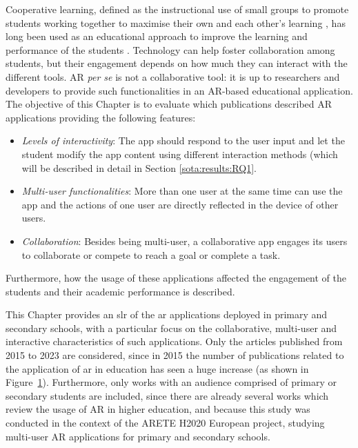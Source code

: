 Cooperative learning, defined as the instructional use of small groups to promote students working together to maximise their own and each other's learning \citep{johnson1991cooperation}, has long been used as an educational approach to improve the learning and performance of the students \citep{johnson2008active, kuh2011piecing}. Technology can help foster collaboration among students, but their engagement depends on how much they can interact with the different tools. AR \textit{per se} is not a collaborative tool: it is up to researchers and developers to provide such functionalities in an AR-based educational application. The objective of this Chapter is to evaluate which publications described AR applications providing the following features:
\begin{itemize}
    \item \emph{Levels of interactivity}: The app should respond to the user input and let the student modify the app content using different interaction methods (which will be described in detail in Section \ref{sota:results:RQ1}.
    \item \emph{Multi-user functionalities}: More than one user at the same time can use the app and the actions of one user are directly reflected in the device of other users.
    \item \emph{Collaboration}: Besides being multi-user, a collaborative app engages its users to collaborate or compete to reach a goal or complete a task.
\end{itemize}
Furthermore, how the usage of these applications affected the engagement of the students and their academic performance is described. 

This Chapter provides an \gls{slr} of the \gls{ar} applications deployed in primary and secondary schools, with a particular focus on the collaborative, multi-user and interactive characteristics of such applications. Only the articles published from 2015 to 2023 are considered, since in 2015 the number of publications related to the application of \gls{ar} in education has seen a huge increase (as shown in Figure~\ref{fig:pappublbg}). Furthermore, only works with an audience comprised of primary or secondary students are included, since there are already several works which review the usage of AR in higher education, and because this study was conducted in the context of the ARETE H2020 European project, studying multi-user AR applications for primary and secondary schools.

\begin{figure}[htbp]
	\begin{center}
	
	\captionsetup{font=small}
	\caption{\fontsize{10pt}{11pt}}
	\label{fig:pappublbg}
    \end{center}
\end{figure}

